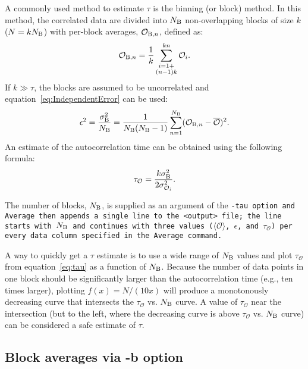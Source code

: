 A commonly used method to estimate $\tau$
is the binning (or block) method. In this method, the correlated data are
divided into $N_{\mathrm{B}}$ non-overlapping blocks of size $k$ ($N=k
N_{\mathrm{B}}$) with per-block averages, $\mathcal{O}_{\mathrm{B},n}$,
defined as:
\begin{equation} \label{eq:BlockAverage} %
  \mathcal{O}_{\mr{B},n} = \frac{1}{k}
    \sum^{k n}_{\substack{i=1+\\(n-1)k}} \mathcal{O}_i.
\end{equation} %
If $k\gg\tau$, the blocks are assumed to be uncorrelated and
equation~\eqref{eq:IndependentError} can be used:
\begin{equation} \label{eq:Error} %
  \epsilon^2 =
  \frac{\sigma^2_{\mr{B}} }{N_{\mr{B}} } = \frac{1}{N_{\mr{B}} (N_{\mr{B}}
  -1)} \sum^{N_{\mr{B}} }_{n=1} (\mathcal{O}_{\mr{B},n} -
  \overline{\mathcal{O}})^2.
\end{equation} %
An estimate of the autocorrelation time can be obtained using the following
formula:
\begin{equation} \label{eq:tau} %
  \tau_{\mathcal{O}} = \frac{k \sigma^2_{\mr{B}} }{2
  \sigma^2_{\mathcal{O}_i}}.
\end{equation} %

The number of blocks, $N_{\mathrm{B}}$, is supplied as an argument of the \tt{-tau}
option and Average then appends a single line to the \tt{<output>} file; the
line starts with $N_{\mathrm{B}}$ and continues with three values
($\langle\mathcal{O}\rangle$, $\epsilon$, and $\tau_{\mathcal{O}}$) per every
data column specified in the Average command.

A way to quickly get a $\tau$ estimate is to use a wide range of $N_{\mathrm{B}}$
values and plot $\tau_{\mathcal{O}}$ from equation~\eqref{eq:tau} as a function
of $N_{\mathrm{B}}$. Because the number of data points in one block should be
significantly larger than the autocorrelation time (e.g., ten times larger),
plotting $f(x)=N/(10x)$ will produce a monotonously decreasing curve that
intersects the $\tau_{\mathcal{O}}$ vs. $N_{\mathrm{B}}$ curve. A value of
$\tau_{\mathcal{O}}$ near the intersection (but to the left, where the
decreasing curve is above $\tau_{\mathcal{O}}$ vs. $N_{\mathrm{B}}$ curve) can be
considered a safe estimate of $\tau$.

\subsection{Block averages via -b option}

